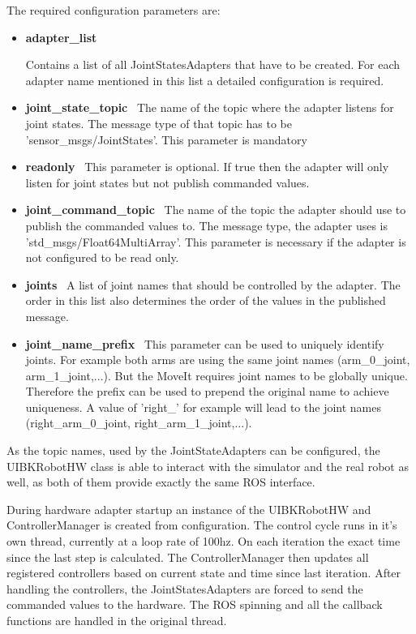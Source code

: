 The required configuration parameters are:

\begin{itemize}

\item \textbf{adapter\_list} \

Contains a list of all JointStatesAdapters that have to be created. For each adapter name mentioned in this list a detailed configuration is required.

\item \textbf{joint\_state\_topic} \
The name of the topic where the adapter listens for joint states. The message type of that topic has to be 'sensor\_msgs/JointStates'. This parameter is mandatory

\item \textbf{readonly} \
This parameter is optional. If true then the adapter will only listen for joint states but not publish commanded values.

\item \textbf{joint\_command\_topic} \
The name of the topic the adapter should use to publish the commanded values to. The message type, the adapter uses is 'std\_msgs/Float64MultiArray'. This parameter is necessary if the adapter is not configured to be read only.

\item \textbf{joints} \
A list of joint names that should be controlled by the adapter. The order in this list also determines the order of the values in the published message.

\item \textbf{joint\_name\_prefix} \
This parameter can be used to uniquely identify joints. For example both arms are using the same joint names (arm\_0\_joint, arm\_1\_joint,...). But the MoveIt requires joint names to be globally unique. Therefore the prefix can be used to prepend the original name to achieve uniqueness. A value of 'right\_' for example will lead to the joint names (right\_arm\_0\_joint, right\_arm\_1\_joint,...).

\end{itemize}

As the topic names, used by the JointStateAdapters can be configured, the UIBKRobotHW class is able to interact with the simulator and the real robot as well, as both of them provide exactly the same ROS interface.

During hardware adapter startup an instance of the UIBKRobotHW and ControllerManager is created from configuration. The control cycle runs in it's own thread, currently at a loop rate of 100hz. On each iteration the exact time since the last step is calculated. The ControllerManager then updates all registered controllers based on current state and time since last iteration. After handling the controllers, the JointStatesAdapters are forced to send the commanded values to the hardware. The ROS spinning and all the callback functions are handled in the original thread.



